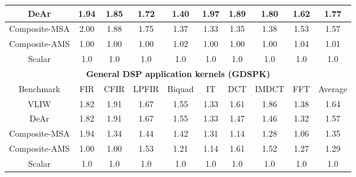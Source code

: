 {\begin{table}[!ht]
{\begin{tabular}{|c|c|c|c|c|c|c|c|c|c|}
                DeAr  &   1.94  &   1.85  &   1.72  &   1.40  &   1.97  &   1.89  &   1.80  &   1.62  &   1.77     \\ \hline
                Composite-MSA  &   2.00  &   1.88  &   1.75  &   1.37  &   1.33  &   1.35  &   1.38  &   1.53  &   1.57     \\ \hline 
                Composite-AMS  &   1.00  &   1.00  &   1.00  &   1.02  &   1.00  &   1.00  &   1.00  &   1.04  &   1.01     \\ \hline 
                Scalar  & 1.0  & 1.0  & 1.0  & 1.0  & 1.0  & 1.0  & 1.0  & 1.0  & 1.0 \\ \hline 
                \multicolumn{10}{|c|}{\textbf{General DSP application kernels (GDSPK)}}                     \\ \hline
                Benchmark  &  FIR  &  CFIR  &  LPFIR  &  Biquad  &  IT  &  DCT  &  IMDCT  &  FFT  &  Average \\ \hline 
                VLIW  &   1.82  &   1.91  &   1.67  &   1.55  &   1.33  &   1.61  &   1.86  &   1.38  &   1.64     \\ \hline 
                DeAr  &   1.82  &   1.91  &   1.67  &   1.55  &   1.33  &   1.47  &   1.46  &   1.32  &   1.57     \\ \hline 
                Composite-MSA  &   1.94  &   1.34  &   1.44  &   1.42  &   1.31  &   1.14  &   1.28  &   1.06  &   1.35     \\ \hline 
                Composite-AMS  &   1.00  &   1.00  &   1.53  &   1.21  &   1.14  &   1.61  &   1.52  &   1.27  &   1.29     \\ \hline 
                Scalar  & 1.0  & 1.0  & 1.0  & 1.0  & 1.0  & 1.0  & 1.0  & 1.0  & 1.0 \\ \hline 
            \end{tabular}
        }
    \end{table}
}
